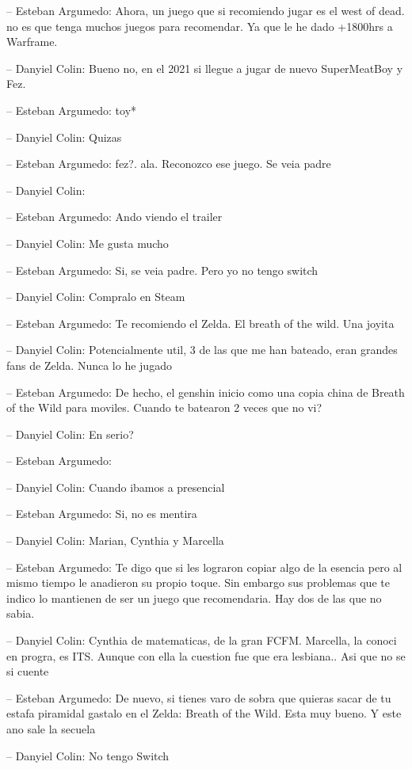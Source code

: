 -- Esteban Argumedo: Ahora, un juego que si recomiendo jugar es el west
of dead. no es que tenga muchos juegos para recomendar. Ya que le he
dado +1800hrs a Warframe.

-- Danyiel Colin: Bueno no, en el 2021 si llegue a jugar de nuevo
SuperMeatBoy y Fez.

-- Esteban Argumedo: toy*

-- Danyiel Colin: Quizas

-- Esteban Argumedo: fez?. ala. Reconozco ese juego. Se veia padre

-- Danyiel Colin:

-- Esteban Argumedo: Ando viendo el trailer

-- Danyiel Colin: Me gusta mucho

-- Esteban Argumedo: Si, se veia padre. Pero yo no tengo switch

-- Danyiel Colin: Compralo en Steam

-- Esteban Argumedo: Te recomiendo el Zelda. El breath of the wild. Una
joyita

-- Danyiel Colin: Potencialmente util, 3 de las que me han bateado, eran
grandes fans de Zelda. Nunca lo he jugado

-- Esteban Argumedo: De hecho, el genshin inicio como una copia china de
Breath of the Wild para moviles. Cuando te batearon 2 veces que no vi?

-- Danyiel Colin: En serio?

-- Esteban Argumedo:

-- Danyiel Colin: Cuando ibamos a presencial

-- Esteban Argumedo: Si, no es mentira

-- Danyiel Colin: Marian, Cynthia y Marcella

-- Esteban Argumedo: Te digo que si les lograron copiar algo de la
esencia pero al mismo tiempo le anadieron su propio toque. Sin embargo
sus problemas que te indico lo mantienen de ser un juego que
recomendaria. Hay dos de las que no sabia.

-- Danyiel Colin: Cynthia de matematicas, de la gran FCFM. Marcella, la
conoci en progra, es ITS. Aunque con ella la cuestion fue que era
lesbiana.. Asi que no se si cuente

-- Esteban Argumedo: De nuevo, si tienes varo de sobra que quieras sacar
de tu estafa piramidal gastalo en el Zelda: Breath of the Wild. Esta muy
bueno. Y este ano sale la secuela

-- Danyiel Colin: No tengo Switch

